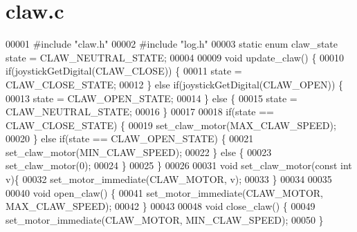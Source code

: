 \section{claw.\+c}
\label{claw_8c_source}

\begin{DoxyCode}
00001 \textcolor{preprocessor}{#include "claw.h"}
00002 \textcolor{preprocessor}{#include "log.h"}
00003 \textcolor{keyword}{static} \textcolor{keyword}{enum} claw_state state = CLAW_NEUTRAL_STATE;
00004 
00009 \textcolor{keywordtype}{void} update_claw() \{
00010   \textcolor{keywordflow}{if}(joystickGetDigital(CLAW_CLOSE)) \{
00011     state = CLAW_CLOSE_STATE;
00012   \} \textcolor{keywordflow}{else} \textcolor{keywordflow}{if}(joystickGetDigital(CLAW_OPEN)) \{
00013     state = CLAW_OPEN_STATE;
00014   \} \textcolor{keywordflow}{else} \{
00015     state = CLAW_NEUTRAL_STATE;
00016   \}
00017 
00018   \textcolor{keywordflow}{if}(state == CLAW_CLOSE_STATE) \{
00019     set_claw_motor(MAX_CLAW_SPEED);
00020   \} \textcolor{keywordflow}{else} \textcolor{keywordflow}{if}(state == CLAW_OPEN_STATE) \{
00021     set_claw_motor(MIN_CLAW_SPEED);
00022   \} \textcolor{keywordflow}{else} \{
00023     set_claw_motor(0);
00024   \}
00025 \}
00026 
00031 \textcolor{keywordtype}{void} set_claw_motor(\textcolor{keyword}{const} \textcolor{keywordtype}{int} v)\{
00032   set_motor_immediate(CLAW_MOTOR, v);
00033 \}
00034 
00035 
00040 \textcolor{keywordtype}{void} open_claw() \{
00041   set_motor_immediate(CLAW_MOTOR, MAX_CLAW_SPEED);
00042 \}
00043 
00048 \textcolor{keywordtype}{void} close_claw() \{
00049   set_motor_immediate(CLAW_MOTOR, MIN_CLAW_SPEED);
00050 \}
\end{DoxyCode}

